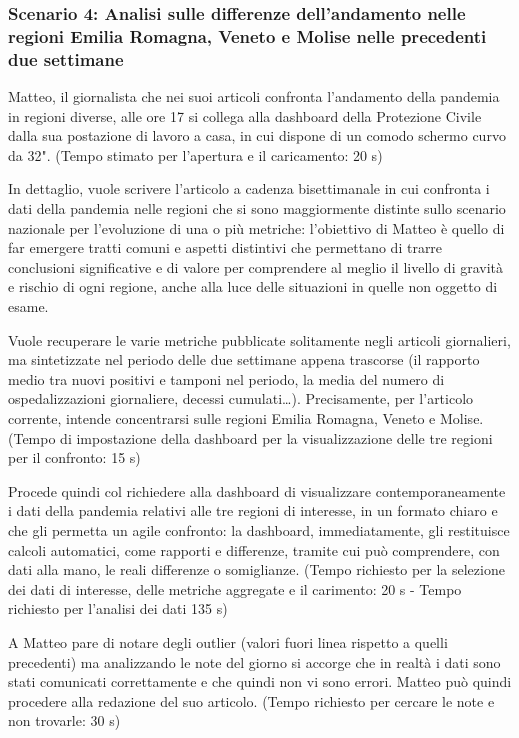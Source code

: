 \subsubsection*{Scenario 4: Analisi sulle differenze dell'andamento nelle regioni Emilia Romagna, Veneto e Molise nelle precedenti due settimane}
Matteo, il giornalista che nei suoi articoli confronta l'andamento della pandemia in regioni diverse, alle ore 17 si collega alla dashboard della Protezione Civile dalla sua postazione di lavoro a casa, in cui dispone di un comodo schermo curvo da 32". (Tempo stimato per l'apertura e il caricamento: 20 s)

In dettaglio, vuole scrivere l'articolo a cadenza bisettimanale in cui confronta i dati della pandemia nelle  regioni che si sono maggiormente distinte sullo scenario nazionale per l'evoluzione di una o più metriche: l'obiettivo di Matteo è quello di far emergere tratti comuni e aspetti distintivi che permettano di trarre conclusioni significative e di valore per comprendere al meglio il livello di gravità e rischio di ogni regione, anche alla luce delle situazioni in quelle non oggetto di esame.

Vuole recuperare le varie metriche pubblicate solitamente negli articoli giornalieri, ma sintetizzate nel periodo delle due settimane appena trascorse (il rapporto medio tra nuovi positivi e tamponi nel periodo, la media del numero di ospedalizzazioni giornaliere, decessi cumulati…).
Precisamente, per l'articolo corrente, intende concentrarsi sulle regioni Emilia Romagna, Veneto e Molise.
(Tempo di impostazione della dashboard per la visualizzazione delle tre regioni per il confronto: 15 s)

Procede quindi col richiedere alla dashboard di visualizzare contemporaneamente i dati della pandemia relativi alle tre regioni di interesse, in un formato chiaro e che gli permetta un agile confronto: la dashboard, immediatamente, gli restituisce calcoli automatici, come rapporti e differenze, tramite cui può comprendere, con dati alla mano, le reali differenze o somiglianze.
(Tempo richiesto per la selezione dei dati di interesse, delle metriche aggregate e il carimento: 20 s - Tempo richiesto per l'analisi dei dati 135 s) 

A Matteo pare di notare degli outlier (valori fuori linea rispetto a quelli precedenti) ma analizzando le note del giorno si accorge che in realtà i dati sono stati comunicati correttamente e che quindi non vi sono errori. Matteo può quindi procedere alla redazione del suo articolo. (Tempo richiesto per cercare le note e non trovarle: 30 s)

